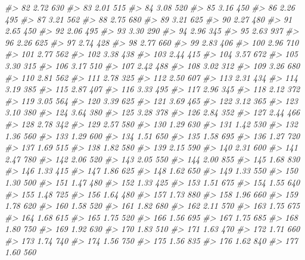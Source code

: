 \documentclass[]{book}
\newenvironment{Shaded}{\begin{snugshade}}{\end{snugshade}}
\newcommand{\CommentTok}[1]{\textcolor[rgb]{0.56,0.35,0.01}{\textit{#1}}}
\begin{document}
\begin{Shaded}
\begin{Highlighting}[]
\CommentTok{#> 82   2.72   630}
\CommentTok{#> 83   2.01   515}
\CommentTok{#> 84   3.08   520}
\CommentTok{#> 85   3.16   450}
\CommentTok{#> 86   2.26   495}
\CommentTok{#> 87   3.21   562}
\CommentTok{#> 88   2.75   680}
\CommentTok{#> 89   3.21   625}
\CommentTok{#> 90   2.27   480}
\CommentTok{#> 91   2.65   450}
\CommentTok{#> 92   2.06   495}
\CommentTok{#> 93   3.30   290}
\CommentTok{#> 94   2.96   345}
\CommentTok{#> 95   2.63   937}
\CommentTok{#> 96   2.26   625}
\CommentTok{#> 97   2.74   428}
\CommentTok{#> 98   2.77   660}
\CommentTok{#> 99   2.83   406}
\CommentTok{#> 100  2.96   710}
\CommentTok{#> 101  2.77   562}
\CommentTok{#> 102  3.38   438}
\CommentTok{#> 103  2.44   415}
\CommentTok{#> 104  3.57   672}
\CommentTok{#> 105  3.30   315}
\CommentTok{#> 106  3.17   510}
\CommentTok{#> 107  2.42   488}
\CommentTok{#> 108  3.02   312}
\CommentTok{#> 109  3.26   680}
\CommentTok{#> 110  2.81   562}
\CommentTok{#> 111  2.78   325}
\CommentTok{#> 112  2.50   607}
\CommentTok{#> 113  2.31   434}
\CommentTok{#> 114  3.19   385}
\CommentTok{#> 115  2.87   407}
\CommentTok{#> 116  3.33   495}
\CommentTok{#> 117  2.96   345}
\CommentTok{#> 118  2.12   372}
\CommentTok{#> 119  3.05   564}
\CommentTok{#> 120  3.39   625}
\CommentTok{#> 121  3.69   465}
\CommentTok{#> 122  3.12   365}
\CommentTok{#> 123  3.10   380}
\CommentTok{#> 124  3.64   380}
\CommentTok{#> 125  3.28   378}
\CommentTok{#> 126  2.84   352}
\CommentTok{#> 127  2.44   466}
\CommentTok{#> 128  2.78   342}
\CommentTok{#> 129  2.57   580}
\CommentTok{#> 130  1.29   630}
\CommentTok{#> 131  1.42   530}
\CommentTok{#> 132  1.36   560}
\CommentTok{#> 133  1.29   600}
\CommentTok{#> 134  1.51   650}
\CommentTok{#> 135  1.58   695}
\CommentTok{#> 136  1.27   720}
\CommentTok{#> 137  1.69   515}
\CommentTok{#> 138  1.82   580}
\CommentTok{#> 139  2.15   590}
\CommentTok{#> 140  2.31   600}
\CommentTok{#> 141  2.47   780}
\CommentTok{#> 142  2.06   520}
\CommentTok{#> 143  2.05   550}
\CommentTok{#> 144  2.00   855}
\CommentTok{#> 145  1.68   830}
\CommentTok{#> 146  1.33   415}
\CommentTok{#> 147  1.86   625}
\CommentTok{#> 148  1.62   650}
\CommentTok{#> 149  1.33   550}
\CommentTok{#> 150  1.30   500}
\CommentTok{#> 151  1.47   480}
\CommentTok{#> 152  1.33   425}
\CommentTok{#> 153  1.51   675}
\CommentTok{#> 154  1.55   640}
\CommentTok{#> 155  1.48   725}
\CommentTok{#> 156  1.64   480}
\CommentTok{#> 157  1.73   880}
\CommentTok{#> 158  1.96   660}
\CommentTok{#> 159  1.78   620}
\CommentTok{#> 160  1.58   520}
\CommentTok{#> 161  1.82   680}
\CommentTok{#> 162  2.11   570}
\CommentTok{#> 163  1.75   675}
\CommentTok{#> 164  1.68   615}
\CommentTok{#> 165  1.75   520}
\CommentTok{#> 166  1.56   695}
\CommentTok{#> 167  1.75   685}
\CommentTok{#> 168  1.80   750}
\CommentTok{#> 169  1.92   630}
\CommentTok{#> 170  1.83   510}
\CommentTok{#> 171  1.63   470}
\CommentTok{#> 172  1.71   660}
\CommentTok{#> 173  1.74   740}
\CommentTok{#> 174  1.56   750}
\CommentTok{#> 175  1.56   835}
\CommentTok{#> 176  1.62   840}
\CommentTok{#> 177  1.60   560}
\end{Highlighting}
\end{Shaded}
\end{document}
